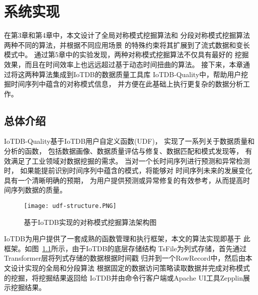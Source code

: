 
\chapter{系统实现}
在第3章和第4章中，本文设计了全局对称模式挖掘算法和
分段对称模式挖掘算法两种不同的算法，并根据不同应用场景
的特殊约束将其扩展到了流式数据和变长模式中。
通过第5章中的实验发现，两种对称模式挖掘算法不仅具有最好的
挖掘效果，而且在时间效率上也远远超过基于动态时间扭曲的算法。
接下来，本章通过将这两种算法集成到IoTDB的数据质量工具库
IoTDB-Quality中，帮助用户挖掘时间序列中蕴含的对称模式信息，
并方便在此基础上执行更复杂的数据分析工作。

\section{总体介绍}
IoTDB-Quality基于IoTDB用户自定义函数(UDF)，
实现了一系列关于数据质量和分析的函数，
包括数据画像、数据质量评估与修复、数据匹配和模式发现等，
有效满足了工业领域对数据挖掘的需求。
当对一个长时间序列进行预测和异常检测时，
如果能提前识别时间序列中蕴含的模式，将能够对
时间序列未来的发展变化具有一个清晰明确的预期，
为用户提供预测或异常修复的有效参考，从而提高时间序列数据的质量。

\begin{figure}
    \centering
    \texttt{[image: udf-structure.PNG]}
    \caption{基于IoTDB实现的对称模式挖掘算法架构图}
    \label{fig:symmetry_structure}
\end{figure}

IoTDB为用户提供了一套成熟的函数管理和执行框架，本文的算法实现即基于
此框架。如图~\ref{fig:symmetry_structure}所示，由于IoTDB的底层存储结构
TsFile为列式存储，首先通过Transformer层将列式存储的数据根据时间戳
归并到一个RowRecord中，然后由本文设计实现的全局和分段算法
根据固定的数据访问策略读取数据并完成对称模式的挖掘，将挖掘结果返回给
IoTDB并由命令行客户端或Apache UI工具Zepplin展示挖掘结果。


